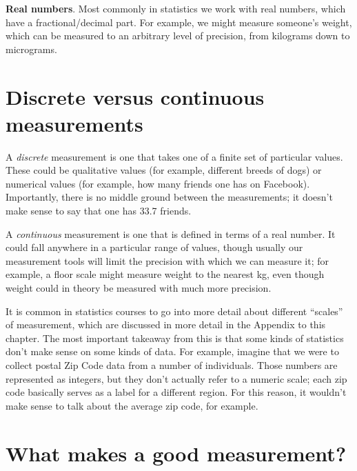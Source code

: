 \documentclass[12pt,]{book}
\theoremstyle{definition}
\theoremstyle{definition}
\theoremstyle{definition}
\theoremstyle{remark}
\begin{document}
\textbf{Real numbers}. Most commonly in statistics we work with real numbers, which have a fractional/decimal part. For example, we might measure someone's weight, which can be measured to an arbitrary level of precision, from kilograms down to micrograms.

\hypertarget{discrete-versus-continuous-measurements}{%
\section{Discrete versus continuous measurements}\label{discrete-versus-continuous-measurements}}

A \emph{discrete} measurement is one that takes one of a finite set of particular values. These could be qualitative values (for example, different breeds of dogs) or numerical values (for example, how many friends one has on Facebook). Importantly, there is no middle ground between the measurements; it doesn't make sense to say that one has 33.7 friends.

A \emph{continuous} measurement is one that is defined in terms of a real number. It could fall anywhere in a particular range of values, though usually our measurement tools will limit the precision with which we can measure it; for example, a floor scale might measure weight to the nearest kg, even though weight could in theory be measured with much more precision.

It is common in statistics courses to go into more detail about different ``scales'' of measurement, which are discussed in more detail in the Appendix to this chapter. The most important takeaway from this is that some kinds of statistics don't make sense on some kinds of data. For example, imagine that we were to collect postal Zip Code data from a number of individuals. Those numbers are represented as integers, but they don't actually refer to a numeric scale; each zip code basically serves as a label for a different region. For this reason, it wouldn't make sense to talk about the average zip code, for example.

\hypertarget{what-makes-a-good-measurement}{%
\section{What makes a good measurement?}\label{what-makes-a-good-measurement}}
\end{document}
